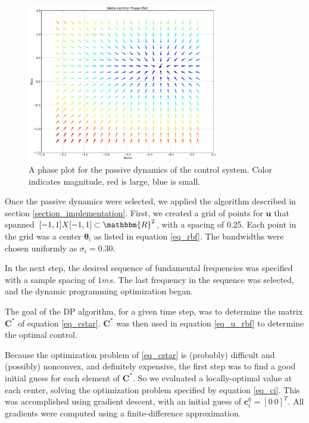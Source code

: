 \documentclass{article} %
\begin{document}
\begin{figure}[h]
\centering
\includegraphics[width=0.75\textwidth]{images/passive_phase_plot.png}
\caption{A phase plot for the passive dynamics of the control system. Color indicates magnitude, red is large, blue is small.}
\label{fig:phase_plot}
\end{figure}

Once the passive dynamics were selected, we applied the algorithm described in section
\ref{section_implementation}. First, we created a grid of points for $\bm{u}$ that
spanned $[-1,1] X [-1, 1] \subset \mathbbm{R}^2$, with a spacing of 0.25. Each point
in the grid was a center $\bm{\theta}_i$ as listed in equation \eqref{eq_rbf}. The bandwidths
were chosen uniformly as $\sigma_i = 0.30$.

In the next step, the desired sequence of fundamental frequencies was specified with
a sample spacing of $1ms$. The last frequency in the sequence was selected, and the
dynamic programming optimization began.

The goal of the DP algorithm, for a given time step, was to determine the matrix
$\bm{C}^*$ of equation \eqref{eq_cstar}. $\bm{C}^*$ was then used in equation 
\eqref{eq_u_rbf} to determine the optimal control.

Because the optimization problem of \eqref{eq_cstar} is (probably) difficult and
(possibly) nonconvex, and definitely expensive, the first step was to find a good
initial guess for each element of $\bm{C}^*$. So we evaluated a locally-optimal
value at each center, solving the optimization problem specified by equation
\eqref{eq_ci}. This was accomplished using gradient descent, with an initial
guess of $\bm{c}_i^0 = \left[ 0 ~ 0 \right] ^T$. All gradients were computed using
a finite-difference approximation.
\end{document}
